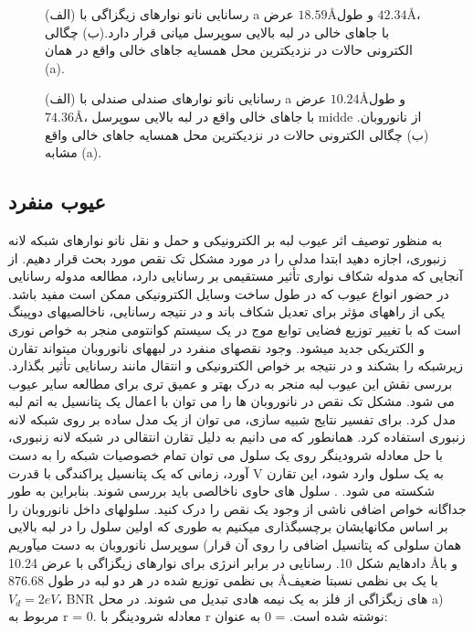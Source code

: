 \begin{figure}[ht]
    \centering
    
    \caption{(الف) رسانایی نانو نوارهای زیگزاگی با a
    عرض $18.59$\AA و طول $42.34$\AA، با جاهای خالی در لبه بالایی سوپرسل میانی قرار دارد.(ب) چگالی الکترونی حالات در نزدیکترین محل همسایه جاهای خالی واقع در همان (a).}
    \label{armvacancy}
  \end{figure}
  
\begin{figure}[ht]
\centering

\caption{(الف) رسانایی نانو نوارهای صندلی صندلی با a
عرض $10.24$\AA و طول $74.36$\AA، با جاهای خالی واقع در لبه بالایی سوپرسل midde از نانوروبان. (ب) چگالی الکترونی حالات در نزدیکترین محل همسایه جاهای خالی واقع مشابه (a).}
\label{zigvacancy}
\end{figure}
\subsection{عیوب منفرد} 
به منظور توصیف اثر عیوب لبه بر الکترونیکی و حمل و نقل نانو نوارهای شبکه لانه زنبوری، اجازه دهید ابتدا مدلی را در مورد مشکل تک نقص مورد بحث قرار دهیم. از آنجایی که مدوله شکاف نواری تأثیر مستقیمی بر رسانایی دارد، مطالعه مدوله رسانایی در حضور انواع عیوب که در طول ساخت وسایل الکترونیکی ممکن است مفید باشد. یکی از راههای مؤثر برای تعدیل شکاف باند و در نتیجه رسانایی، ناخالصیهای دوپینگ است که با تغییر توزیع فضایی توابع موج در یک سیستم کوانتومی منجر به خواص نوری و الکتریکی جدید میشود. وجود نقصهای منفرد در لبههای نانوروبان میتواند تقارن زیرشبکه را بشکند و در نتیجه بر خواص الکترونیکی و انتقال مانند رسانایی تأثیر بگذارد. بررسی نقش این عیوب لبه منجر به درک بهتر و عمیق تری برای مطالعه سایر عیوب می شود. مشکل تک نقص در نانوروبان ها را می توان با اعمال یک پتانسیل به اتم لبه مدل کرد. برای تفسیر نتایج شبیه سازی، می توان از یک مدل ساده بر روی شبکه لانه زنبوری استفاده کرد. همانطور که می دانیم به دلیل تقارن انتقالی در شبکه لانه زنبوری، با حل معادله شرودینگر روی یک سلول می توان تمام خصوصیات شبکه را به دست آورد، زمانی که یک پتانسیل پراکندگی با قدرت V به یک سلول وارد شود، این تقارن شکسته می شود. . سلول های حاوی ناخالصی باید بررسی شوند. بنابراین به طور جداگانه خواص اضافی ناشی از وجود یک نقص را درک کنید. سلولهای داخل نانوروبان را بر اساس مکانهایشان برچسبگذاری میکنیم به طوری که اولین سلول را در لبه بالایی سوپرسل نانوروبان به دست میآوریم (همان سلولی که پتانسیل اضافی را روی آن قرار دادهایم شکل 10. رسانایی در برابر انرژی برای نوارهای زیگزاگی با عرض 10.24 \AA و با بی نظمی توزیع شده در هر دو لبه در طول 876.68 \AA با یک بی نظمی نسبتا ضعیف $V_d = 2 eV$، BNR های زیگزاگی از فلز به یک نیمه هادی تبدیل می شوند. در محل a) مربوط به r = 0. معادله شرودینگر با r نوشته شده است. = 0 به عنوان:
